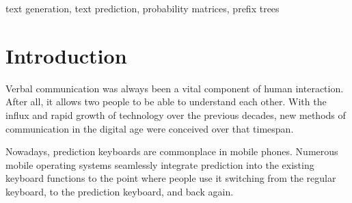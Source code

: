 \documentclass[journal]{./IEEE/IEEEtran}
\title{\SPTITLE}
\author{\ADVISEE~and~\ADVISER
\REMARK
}
\begin{document}
\maketitle

\begin{abstract}
With the advent of the digital age, communication has evolved to a point where technology is seamlessly integrated into day-to-day conversation. Primarily found in mobile phones, text prediction systems involves streamlining the communication by providing users with suggested words that they can select, based on the previous word they provided. This study aims to implement a similar technology, embedded in an application developed for the Chrome browser to provide the power of text prediction in desktop environments, in an application most users use in their day-to-day lives. The predictor was developed using two main and two minor text representations of the text input, of which is the probability matrix, the prefix tree, the sequence, and the bag-of-words respectively.
\end{abstract}

\begin{keywords}
text generation, text prediction, probability matrices, prefix trees
\end{keywords}

\section{Introduction}

Verbal communication was always been a vital component of human interaction. After all, it allows two people to be able to understand each other. With the influx and rapid growth of technology over the previous decades, new methods of communication in the digital age were conceived over that timespan.


Nowadays, prediction keyboards are commonplace in mobile phones. Numerous mobile operating systems seamlessly integrate prediction into the existing keyboard functions to the point where people use it switching from the regular keyboard, to the prediction keyboard, and back again.
\end{document}
